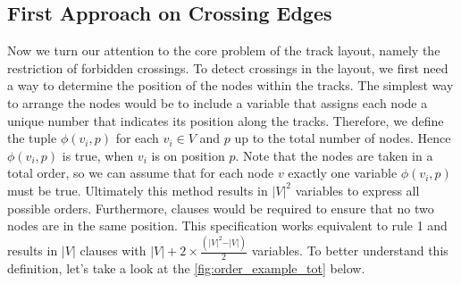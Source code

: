 \documentclass[bachelor, english]{algothesis}
\begin{document}
\subsection{First Approach on Crossing Edges}
Now we turn our attention to the core problem of the track layout, namely the restriction of forbidden crossings. To detect crossings in the layout, we first need a way to determine the position of the nodes within the tracks. The simplest way to arrange the nodes would be to include a variable that assigns each node a unique number that indicates its position along the tracks. Therefore, we define the tuple $\phi(v_i,p)$ for each $v_i \in V$ and $p$ up to the total number of nodes. Hence $\phi(v_i,p)$ is true, when $v_i$ is on position $p$. Note that the nodes are taken in a total order, so we can assume that for each node $v$ exactly one variable $\phi(v_i,p)$ must be true. Ultimately this method results in ${\vert V \vert}^2$ variables to express all possible orders. Furthermore, clauses would be required to ensure that no two nodes are in the same position. This specification works equivalent to rule 1 and results in $\vert V \vert$ clauses with $\vert V \vert + 2 \times \frac{(\vert V \vert^2-\vert V \vert)}{2}$ variables. To better understand this definition, let's take a look at the \cref{fig:order_example_tot} below.
\end{document}
